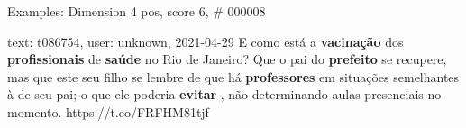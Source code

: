 \begin{frame}{Examples: Dimension 4 pos, score 6, \# 000008}
\footnotesize
\begin{exampleblock}{text: t086754, user: unknown, 2021-04-29}
E como está a \textbf{vacinação} dos \textbf{profissionais} de \textbf{saúde} 
no Rio de Janeiro? Que o pai do \textbf{prefeito} se recupere, mas que este seu 
filho se lembre de que há \textbf{professores} em situações semelhantes à de 
seu pai; o que ele poderia \textbf{evitar} , não determinando aulas presenciais 
no momento. https://t.co/FRFHM81tjf 
\end{exampleblock}
\end{frame}
